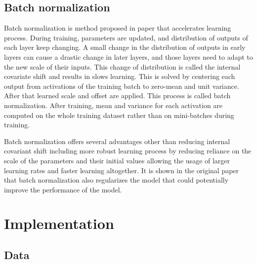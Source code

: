 \documentclass[times, utf8, diplomski, numeric, english]{fer}
\begin{document}
\section{Batch normalization}
Batch normalization is method proposed in paper \cite{BNORM} that accelerates learning process. 
During training, parameters are updated, and distribution of outputs of each layer keep changing. A small change in the distribution of outputs in early layers can cause a drastic change in later layers, and those layers need to adapt to the new scale of their inputs. This change of distribution is called the internal covariate shift and results in slows learning.
This is solved by centering each output from activations of the training batch to zero-mean and unit variance. After that learned scale and offset are applied. This process is called batch normalization. 
After training, mean and variance for each activation are computed on the whole training dataset rather than on mini-batches during training. 

Batch normalization offers several advantages other than reducing internal covariant shift including more robust learning process by reducing reliance on the scale of the parameters and their initial values allowing the usage of larger learning rates and faster learning altogether. It is shown in the original paper that batch normalization also regularizes the model that could potentially improve the performance of the model.

\chapter{Implementation}


\section{Data}
\end{document}
